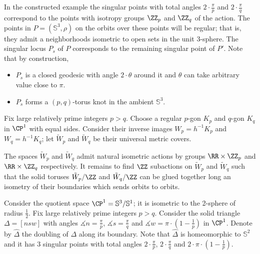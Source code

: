 In the constructed example 
the singular points with total angles $2\cdot\tfrac\pi p$ and
$2\cdot\tfrac\pi q$
correspond to the points with isotropy groups $\ZZ_p$ and $\ZZ_q$ of the action.
The points in $P=(\mathbb{S}^3,\rho)$ on the orbits over these points will be regular; 
that is, they admit a neighborhoods isometric to open sets in the unit 3-sphere.
The singular locus $P_s$
of $P$ corresponds to the remaining singular point of $P'$.
Note that by construction,
\begin{itemize}
\item $P_s$ is a closed geodesic with angle $2\cdot\theta$ around it and $\theta$ can take arbitrary value close to $\pi$.
\item $P_s$ forms a $(p,q)$-torus knot in the ambient $\mathbb{S}^3$.
\end{itemize}
\qedsf






















Fix large relatively prime integers $p>q$.
Choose a regular $p$-gon $K_p$ and $q$-gon $K_q$ in $\CP^1$ with equal sides.
Consider their inverse images $W_p=h^{-1}K_p$ and $W_q=h^{-1}K_q$;
let $\tilde W_p$ and $\tilde W_q$ be their universal metric covers.

The spaces $\tilde W_p$ and $\tilde W_q$ admit natural isometric actions by groups $\RR\times\ZZ_p$ and $\RR\times\ZZ_q$ respectively.
It remains to find $\ZZ$ subactions on $\tilde W_p$ and $\tilde W_q$ such that the solid toruses $\tilde W_p/\ZZ$ and $\tilde W_q/\ZZ$ can be glued together long an isometry of their boundaries which sends orbits to orbits.

Consider the quotient space $\CP^1=\mathbb S^3/\mathbb S^1$;
it is isometric to the 2-sphere of radius $\tfrac12$.
Fix large relatively prime integers $p>q$. 
Consider the solid triangle $\Delta=[nsw]$ with angles $\measuredangle n=\tfrac\pi p$, $\measuredangle s=\tfrac\pi q$ and $\measuredangle w=\pi\cdot(1-\tfrac1 p)$ in $\CP^1$.
Denote by $\hat \Delta$ the  doubling of $\Delta$ along  its boundary.
Note that $\hat \Delta$ is homeomorphic to $\mathbb S^2$ and
it has 3 singular points with total angles $2\cdot\tfrac\pi p$,
$2\cdot\tfrac\pi q$ and $2\cdot\pi\cdot(1-\tfrac1 p)$.

